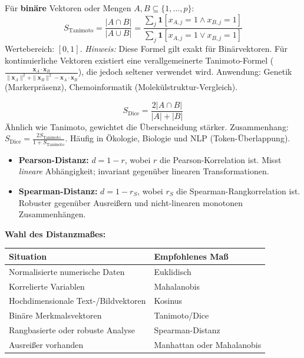 Für \textbf{binäre} Vektoren oder Mengen $A, B \subseteq \{1,\ldots,p\}$: $$S_{\text{Tanimoto}} = \frac{|A \cap B|}{|A \cup B|} = \frac{\sum_{j} \mathbf{1}[x_{A,j}=1 \wedge x_{B,j}=1]}{\sum_{j} \mathbf{1}[x_{A,j}=1 \vee x_{B,j}=1]}$$ Wertebereich: $[0, 1]$. \textit{Hinweis:} Diese Formel gilt exakt für Binärvektoren. Für kontinuierliche Vektoren existiert eine verallgemeinerte Tanimoto-Formel ($\frac{\mathbf{x}_A \cdot \mathbf{x}_B}{\|\mathbf{x}_A\|^2 + \|\mathbf{x}_B\|^2 - \mathbf{x}_A \cdot \mathbf{x}_B}$), die jedoch seltener verwendet wird. Anwendung: Genetik (Markerpräsenz), Chemoinformatik (Molekülstruktur-Vergleich).

$$S_{\text{Dice}} = \frac{2|A \cap B|}{|A| + |B|}$$ Ähnlich wie Tanimoto, gewichtet die Überschneidung stärker.
Zusammenhang: $S_{\text{Dice}} = \frac{2 S_{\text{Tanimoto}}}{1 + S_{\text{Tanimoto}}}$. Häufig in Ökologie, Biologie und NLP (Token-Überlappung).

\begin{itemize}[leftmargin=1.5em]
    \item \textbf{Pearson-Distanz:} $d = 1 - r$, wobei $r$ die Pearson-Korrelation ist. Misst \emph{lineare} Abhängigkeit; invariant gegenüber linearen Transformationen.
    \item \textbf{Spearman-Distanz:} $d = 1 - r_S$, wobei $r_S$ die Spearman-Rangkorrelation ist. Robuster gegenüber Ausreißern und nicht-linearen monotonen Zusammenhängen.
\end{itemize}

\textbf{Wahl des Distanzmaßes:}
\begin{table}[h]
    \centering
    \small
    \begin{tabular}{|l|l|}
        \hline
        \textbf{Situation} & \textbf{Empfohlenes Maß} \\
        \hline
        Normalisierte numerische Daten & Euklidisch \\
        \hline
        Korrelierte Variablen & Mahalanobis \\
        \hline
        Hochdimensionale Text-/Bildvektoren & Kosinus \\
        \hline
        Binäre Merkmalsvektoren & Tanimoto/Dice \\
        \hline
        Rangbasierte oder robuste Analyse & Spearman-Distanz \\
        \hline
        Ausreißer vorhanden & Manhattan oder Mahalanobis \\
        \hline
    \end{tabular}
\end{table}

